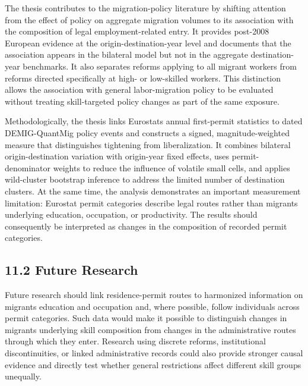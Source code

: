 \documentclass[11pt,a4paper]{article}
\begin{document}
The thesis contributes to the migration-policy literature by shifting
attention from the effect of policy on aggregate migration volumes to
its association with the composition of legal employment-related entry.
It provides post-2008 European evidence at the origin-destination-year
level and documents that the association appears in the bilateral model
but not in the aggregate destination-year benchmarks. It also separates
reforms applying to all migrant workers from reforms directed
specifically at high- or low-skilled workers. This distinction allows
the association with general labor-migration policy to be evaluated
without treating skill-targeted policy changes as part of the same
exposure.

Methodologically, the thesis links Eurostat\textquotesingle s annual
first-permit statistics to dated DEMIG-QuantMig policy events and
constructs a signed, magnitude-weighted measure that distinguishes
tightening from liberalization. It combines bilateral origin-destination
variation with origin-year fixed effects, uses permit-denominator
weights to reduce the influence of volatile small cells, and applies
wild-cluster bootstrap inference to address the limited number of
destination clusters. At the same time, the analysis demonstrates an
important measurement limitation: Eurostat permit categories describe
legal routes rather than migrants\textquotesingle{} underlying
education, occupation, or productivity. The results should consequently
be interpreted as changes in the composition of recorded permit
categories.

\subsection{11.2 Future Research}\label{future-research}

Future research should link residence-permit routes to harmonized
information on migrants\textquotesingle{} education and occupation and,
where possible, follow individuals across permit categories. Such data
would make it possible to distinguish changes in
migrants\textquotesingle{} underlying skill composition from changes in
the administrative routes through which they enter. Research using
discrete reforms, institutional discontinuities, or linked
administrative records could also provide stronger causal evidence and
directly test whether general restrictions affect different skill groups
unequally.
\end{document}

